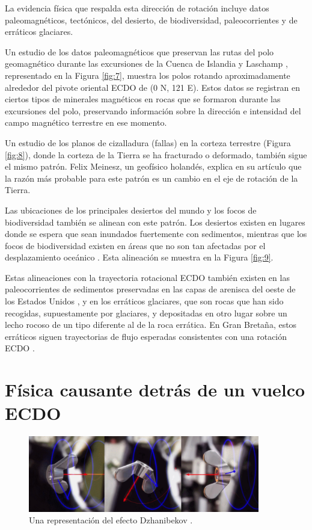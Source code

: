 \documentclass[10pt,twocolumn,letterpaper]{article}
\begin{document}
La evidencia física que respalda esta dirección de rotación incluye datos paleomagnéticos, tectónicos, del desierto, de biodiversidad, paleocorrientes y de erráticos glaciares.

Un estudio de los datos paleomagnéticos que preservan las rutas del polo geomagnético durante las excursiones de la Cuenca de Islandia y Laschamp \cite{35}, representado en la Figura \ref{fig:7}, muestra los polos rotando aproximadamente alrededor del pivote oriental ECDO de (0 N, 121 E). Estos datos se registran en ciertos tipos de minerales magnéticos en rocas que se formaron durante las excursiones del polo, preservando información sobre la dirección e intensidad del campo magnético terrestre en ese momento.

Un estudio de los planos de cizalladura (fallas) en la corteza terrestre (Figura \ref{fig:8}), donde la corteza de la Tierra se ha fracturado o deformado, también sigue el mismo patrón. Felix Meinesz, un geofísico holandés, explica en su artículo \cite{36} que la razón más probable para este patrón es un cambio en el eje de rotación de la Tierra.

Las ubicaciones de los principales desiertos del mundo y los focos de biodiversidad también se alinean con este patrón. Los desiertos existen en lugares donde se espera que sean inundados fuertemente con sedimentos, mientras que los focos de biodiversidad existen en áreas que no son tan afectadas por el desplazamiento oceánico \cite{28}. Esta alineación se muestra en la Figura \ref{fig:9}.

Estas alineaciones con la trayectoria rotacional ECDO también existen en las paleocorrientes de sedimentos preservadas en las capas de arenisca del oeste de los Estados Unidos \cite{21}, y en los erráticos glaciares, que son rocas que han sido recogidas, supuestamente por glaciares, y depositadas en otro lugar sobre un lecho rocoso de un tipo diferente al de la roca errática. En Gran Bretaña, estos erráticos siguen trayectorias de flujo esperadas consistentes con una rotación ECDO \cite{67,68}.

\section{Física causante detrás de un vuelco ECDO}

\begin{figure}
\begin{center}
\includegraphics[width=0.9\textwidth]{dzhani.jpg}
\end{center}
   \caption{Una representación del efecto Dzhanibekov \cite{28}.}
\label{fig:10}
\end{figure}
\end{document}
